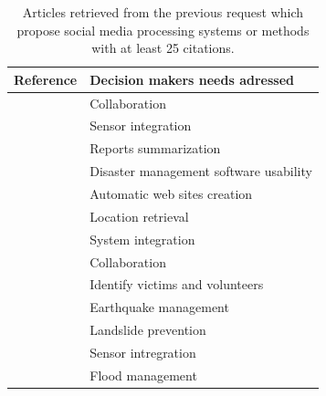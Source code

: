 \begin{table}[bp]
    \centering
    \renewcommand{\arraystretch}{1.5}
    \caption{Articles retrieved from the previous request which propose social media processing systems or methods with at least 25 citations.}
    \begin{tabular}{m{} m{}}
        Reference                                                & Decision makers needs adressed         \\ [0.5ex]
        \toprule
        \cite{benabenMetamodelItsOntology2008b}                  & Collaboration                          \\
        \cite{babitskiOntologybasedIntegrationSensor2009a}       & Sensor integration                     \\
        \cite{liOntologyenrichedMultiDocumentSummarization2010a} & Reports summarization                  \\
        \cite{babitskiSoKNOSUsingSemantic2011a}                  & Disaster management software usability \\
        \cite{chouOntologyDevelopingWeb2011a}                    & Automatic web sites creation           \\
        \cite{ghahremanlouGeotaggingTwitterMessages2014a}        & Location retrieval                     \\
        \cite{madniSystemsIntegrationKey2014a}                   & System integration                     \\
        \cite{othmanDevelopmentValidationDisaster2014b}          & Collaboration                          \\
        \cite{purohitIdentifyingSeekersSuppliers2014a}           & Identify victims and volunteers        \\
        \cite{xuModelingRepresentationEarthquake2014a}           & Earthquake management                  \\
        \cite{jungOntologydrivenSlopeModeling2015a}              & Landslide prevention                   \\
        \cite{posladSemanticIoTEarly2015a}                       & Sensor intregration                    \\
        \cite{qiuIntegratedFloodManagement2017a}                 & Flood management                       \\
        \bottomrule
    \end{tabular}
    \label{table:situation-models-main-articles}
\end{table}

